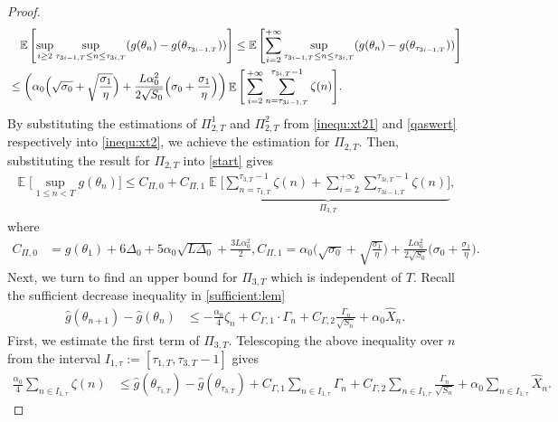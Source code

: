 \documentclass[standalone]{article}
\newcommand{\E}{\mathbb{E}}
\DeclareMathOperator{\Expect}{\mathbb{E}}
\begin{document}
\begin{proof}
\begin{align}\label{inqu:diff:g:tau2}
&\quad \E \left[\sup_{i\ge 2}\sup_{\tau_{3i-1,T}\le n\le \tau_{3i,T}}(g(\theta_{n})-g(\theta_{\tau_{3i-1,T}}))\right] \leq \E \left[\sum_{i=2}^{+\infty}\sup_{\tau_{3i-1,T}\le n\le \tau_{3i,T}}(g(\theta_{n})-g(\theta_{\tau_{3i-1,T}}))\right]  \notag \\
& \leq \bigg(\alpha_{0}\Big(\sqrt{\sigma_{0}}+\sqrt{\frac{\sigma_{1}}{\eta}}\Big)+\frac{ L\alpha_{0}^{2}}{2\sqrt{S_{0}}}\Big(\sigma_{0}+\frac{\sigma_{1}}{\eta}\Big)\bigg)\Expect\Bigg[\sum_{i=2}^{+\infty}\sum_{n=\tau_{3i-1,T}}^{\tau_{3i,T}-1}\zeta(n)\Bigg].
\end{align}
By substituting the estimations of $\Pi_{2,T}^1$ and $\Pi_{2,T}^2$ from \cref{inequ:xt21} and \cref{qaswert} respectively into \cref{inequ:xt2}, we achieve the estimation for $\Pi_{2,T}$. Then, substituting the result for $\Pi_{2,T}$ into \cref{start} gives
\begin{align}\label{wxm_200}
\Expect\Big[\sup_{1\le n<T}g(\theta_{n})\Big]\le C_{\Pi,0}+C_{\Pi, 1}\underbrace{\Expect\Bigg[\sum_{n=\tau_{1,T}}^{\tau_{3,T}-1}\zeta(n)+\sum_{i=2}^{+\infty}\sum_{\tau_{3i-1,T}}^{\tau_{3i,T}-1}\zeta(n)\Bigg]}_{\Pi_{3,T}},
\end{align}
where
\begin{align}\label{constant_Pi}
C_{\Pi,0}&=g(\theta_{1})+6\Delta_{0}+5\alpha_{0}\sqrt{ L\Delta_{0}}+\frac{3 L\alpha_{0}^{2}}{2}, C_{\Pi,1}=\alpha_{0}\Big(\sqrt{\sigma_{0}}+\sqrt{\frac{\sigma_{1}}{\eta}}\Big)+\frac{ L\alpha_{0}^{2}}{2\sqrt{S_{0}}}\Big(\sigma_{0}+\frac{\sigma_{1}}{\eta}\Big).
\end{align}
Next, we turn to find an upper bound for $\Pi_{3,T}$ which is independent of $T$. Recall the sufficient decrease inequality in \cref{sufficient:lem}
\begin{align*}
\hat{g}(\theta_{n+1})-\hat{g}(\theta_{n}) & \le -\frac{\alpha_{0}}{4}\zeta_{n}+C_{\Gamma,1}\cdot \Gamma_n  +C_{\Gamma,2}\frac{\Gamma_{n}}{\sqrt{S_{n}}} + \alpha_0 \hat{X}_{n}.
\end{align*}
First, we estimate the first term of $\Pi_{3,T}$. Telescoping the above inequality over $n$ from the interval \(I_{1,\tau}:=[\tau_{1,T},\tau_{3,T}-1]\)  gives
\begin{align*}%
\frac{\alpha_{0}}{4}\sum_{n \in I_{1,\tau}}\zeta(n)&\le \hat{g}(\theta_{\tau_{1,T}})-\hat{g}(\theta_{\tau_{3,T}})+C_{\Gamma,1}\sum_{n \in I_{1,\tau}} \Gamma_n+C_{\Gamma,2}\sum_{n \in I_{1,\tau}}\frac{\Gamma_{n}}{\sqrt{S_{n}}}+\alpha_0 \sum_{n \in I_{1,\tau}}\hat{X}_{n}.

\end{align*}
\end{proof}
\end{document}
